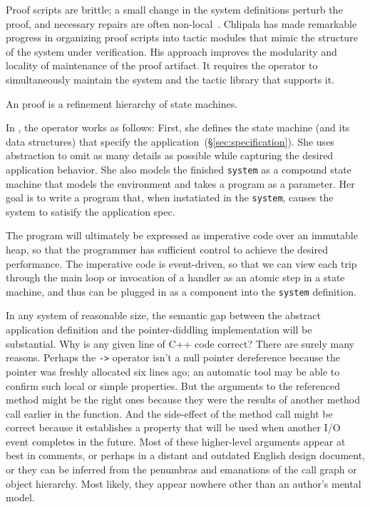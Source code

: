 Proof scripts are brittle; a small change in the system definitions perturb
the proof, and necessary repairs are often non-local~\cite{}.
Chlipala has made remarkable progress in organizing proof scripts into
tactic modules that mimic the structure of the system under
verification. His approach improves the modularity and locality
of maintenance of the proof artifact.
It requires the operator to simultaneously maintain the system
and the tactic library that supports it.



An {\ironstar} proof is a refinement hierarchy of state machines.

In {\ironstar}, the operator works as follows:
First, she defines the state machine (and its data structures) that
specify the application~(\S\ref{sec:specification}).
She uses abstraction to omit as many details as possible while capturing the
desired application behavior.
She also models the finished \texttt{system} as a compound state machine that
models the environment and takes a program as a parameter.
Her goal is to write a program that, when instatiated in the \texttt{system},
causes the system to satisify the application spec.

The program will ultimately be expressed as
imperative code over an immutable heap,
so that the programmer has sufficient control to achieve the
desired performance.
The imperative code is event-driven, so that we can view each
trip through the main loop or invocation of a handler as an
atomic step in a state machine,
and thus can be plugged in as a component into the \texttt{system} definition.

In any system of reasonable size, the semantic gap between the abstract
application definition and the pointer-diddling implementation will be
substantial.
Why is any given line of C++ code correct? There are surely many reasons.
Perhaps the \texttt{->} operator isn't a null pointer dereference because
the pointer was freshly allocated six lines ago; an automatic tool may
be able to confirm such local or simple properties.
But the arguments to the referenced method might be the right ones because
they were the results of another method call earlier in the function.
And the side-effect of the method call might be correct
because it establishes a property that will be used when another I/O
event completes in the future.
Most of these higher-level arguments appear at best in comments,
or perhaps in a distant and outdated English design document,
or they can be inferred from the penumbras and emanations of the
call graph or object hierarchy.
Most likely, they appear nowhere other than an author's mental model.

